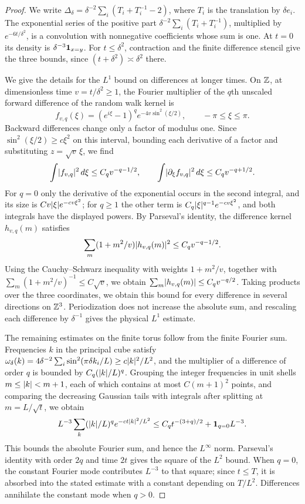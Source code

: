 \begin{proof}
We write $\Delta_\delta=\delta^{-2}\sum_i(T_i+T_i^{-1}-2)$, where $T_i$ is the translation by $\delta e_i$. The exponential series of the positive part $\delta^{-2}\sum_i(T_i+T_i^{-1})$, multiplied by $e^{-6t/\delta^2}$, is a convolution with nonnegative coefficients whose sum is one. At $t=0$ its density is $\delta^{-3}\mathbf 1_{x=y}$. For $t\le\delta^2$, contraction and the finite difference stencil give the three bounds, since $(t+\delta^2)\asymp\delta^2$ there.

We give the details for the $L^1$ bound on differences at longer times. On $\mathbb Z$, at dimensionless time $v=t/\delta^2\ge1$, the Fourier multiplier of the $q$th unscaled forward difference of the random walk kernel is
\[
 f_{v,q}(\xi)=(e^{i\xi}-1)^qe^{-4v\sin^2(\xi/2)},\qquad -\pi\le\xi\le\pi.
\]
Backward differences change only a factor of modulus one. Since $\sin^2(\xi/2)\ge c\xi^2$ on this interval, bounding each derivative of a factor and substituting $z=\sqrt v\,\xi$, we find
\[
 \int\lvert f_{v,q}\rvert^2\,d\xi\le C_qv^{-q-1/2},\qquad
 \int\lvert \partial_\xi f_{v,q}\rvert^2\,d\xi\le C_qv^{-q+1/2}.
\]
For $q=0$ only the derivative of the exponential occurs in the second integral, and its size is $Cv\lvert \xi\rvert e^{-cv\xi^2}$; for $q\ge1$ the other term is $C_q\lvert \xi\rvert^{q-1}e^{-cv\xi^2}$, and both integrals have the displayed powers. By Parseval's identity, the difference kernel $h_{v,q}(m)$ satisfies
\[
 \sum_m(1+m^2/v)\lvert h_{v,q}(m)\rvert^2\le C_qv^{-q-1/2}.
\]
Using the Cauchy--Schwarz inequality with weights $1+m^2/v$, together with $\sum_m(1+m^2/v)^{-1}\le C\sqrt v$, we obtain $\sum_m\lvert h_{v,q}(m)\rvert\le C_qv^{-q/2}$. Taking products over the three coordinates, we obtain this bound for every difference in several directions on $\mathbb Z^3$. Periodization does not increase the absolute sum, and rescaling each difference by $\delta^{-1}$ gives the physical $L^1$ estimate.

The remaining estimates on the finite torus follow from the finite Fourier sum. Frequencies $k$ in the principal cube satisfy $\omega_\delta(k)=4\delta^{-2}\sum_i\sin^2(\pi\delta k_i/L)\ge c\lvert k\rvert^2/L^2$, and the multiplier of a difference of order $q$ is bounded by $C_q(\lvert k\rvert/L)^q$. Grouping the integer frequencies in unit shells $m\le\lvert k\rvert<m+1$, each of which contains at most $C(m+1)^2$ points, and comparing the decreasing Gaussian tails with integrals after splitting at $m=L/\sqrt t$, we obtain
\[
 L^{-3}\sum_k(\lvert k\rvert/L)^qe^{-ct\lvert k\rvert^2/L^2}\le C_qt^{-(3+q)/2}+\mathbf 1_{q=0}L^{-3}.
\]
This bounds the absolute Fourier sum, and hence the $L^\infty$ norm. Parseval's identity with order $2q$ and time $2t$ gives the square of the $L^2$ bound. When $q=0$, the constant Fourier mode contributes $L^{-3}$ to that square; since $t\le T$, it is absorbed into the stated estimate with a constant depending on $T/L^2$. Differences annihilate the constant mode when $q>0$.
\end{proof}


